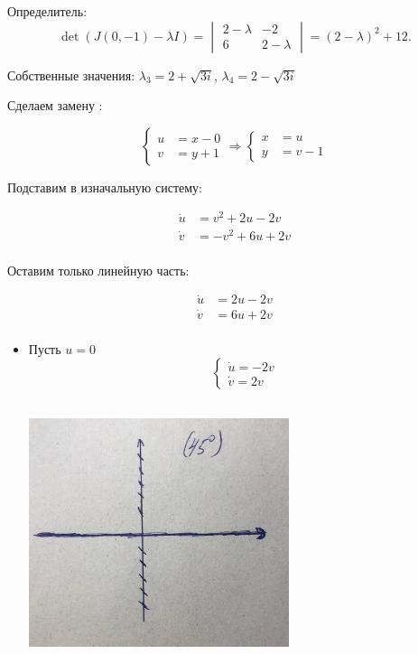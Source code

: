 \documentclass[12pt]{article}
\begin{document}
\begin{itemize}
  Определитель:\[
\det(J(0, -1) - \lambda I) = \begin{vmatrix} 2-\lambda & -2 \\ 6 & 2-\lambda \end{vmatrix} = (2-\lambda)^2 + 12.
\]
  
  Собственные значения: $\lambda_3 = 2+\sqrt{3i}$, $\lambda_4 = 2-\sqrt{3i}$

  Сделаем замену :

\[
\left\{
\begin{aligned}
u &= x - 0 \\
v &= y + 1
\end{aligned}
\right.
\Rightarrow
\left\{
\begin{aligned}
x &= u \\
y &= v - 1
\end{aligned}
\right.
\]

Подставим в изначальную систему:

\[
\begin{aligned}
\dot{u} &= v^2 + 2u - 2v \\
\dot{v} &= -v^2 + 6u + 2v \\
\end{aligned}
\]

Оставим только линейную часть:

\[
\begin{aligned}
\dot{u} &= 2u - 2v \\
\dot{v} &= 6u + 2v \\
\end{aligned}
\]

\begin{itemize}
\item Пусть $u = 0$
        \[
\begin{cases}
\dot{u} = -2v \\
\dot{v} = 2v
\end{cases}
\]
\begin{center}
\includegraphics[width=3in,height=3in]{system_two_for_zerou_5.jpeg}
\end{center}


\end{itemize}
\end{itemize}
\end{document}
